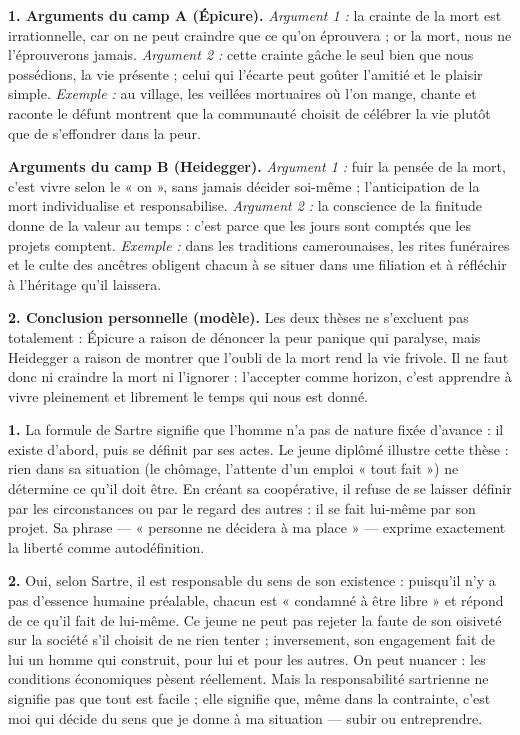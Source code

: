 \documentclass[11pt]{article}
\begin{document}
\begin{corrige}
\textbf{1. Arguments du camp A (Épicure).} \emph{Argument 1 :} la crainte de la mort est irrationnelle, car on ne peut craindre que ce qu'on éprouvera ; or la mort, nous ne l'éprouverons jamais. \emph{Argument 2 :} cette crainte gâche le seul bien que nous possédions, la vie présente ; celui qui l'écarte peut goûter l'amitié et le plaisir simple. \emph{Exemple :} au village, les veillées mortuaires où l'on mange, chante et raconte le défunt montrent que la communauté choisit de célébrer la vie plutôt que de s'effondrer dans la peur.

\textbf{Arguments du camp B (Heidegger).} \emph{Argument 1 :} fuir la pensée de la mort, c'est vivre selon le « on », sans jamais décider soi-même ; l'anticipation de la mort individualise et responsabilise. \emph{Argument 2 :} la conscience de la finitude donne de la valeur au temps : c'est parce que les jours sont comptés que les projets comptent. \emph{Exemple :} dans les traditions camerounaises, les rites funéraires et le culte des ancêtres obligent chacun à se situer dans une filiation et à réfléchir à l'héritage qu'il laissera.

\textbf{2. Conclusion personnelle (modèle).} Les deux thèses ne s'excluent pas totalement : Épicure a raison de dénoncer la peur panique qui paralyse, mais Heidegger a raison de montrer que l'oubli de la mort rend la vie frivole. Il ne faut donc ni craindre la mort ni l'ignorer : l'accepter comme horizon, c'est apprendre à vivre pleinement et librement le temps qui nous est donné.
\end{corrige}

\begin{corrige}
\textbf{1.} La formule de Sartre signifie que l'homme n'a pas de nature fixée d'avance : il existe d'abord, puis se définit par ses actes. Le jeune diplômé illustre cette thèse : rien dans sa situation (le chômage, l'attente d'un emploi « tout fait ») ne détermine ce qu'il doit être. En créant sa coopérative, il refuse de se laisser définir par les circonstances ou par le regard des autres : il se fait lui-même par son projet. Sa phrase — « personne ne décidera à ma place » — exprime exactement la liberté comme autodéfinition.

\textbf{2.} Oui, selon Sartre, il est responsable du sens de son existence : puisqu'il n'y a pas d'essence humaine préalable, chacun est « condamné à être libre » et répond de ce qu'il fait de lui-même. Ce jeune ne peut pas rejeter la faute de son oisiveté sur la société s'il choisit de ne rien tenter ; inversement, son engagement fait de lui un homme qui construit, pour lui et pour les autres. On peut nuancer : les conditions économiques pèsent réellement. Mais la responsabilité sartrienne ne signifie pas que tout est facile ; elle signifie que, même dans la contrainte, c'est moi qui décide du sens que je donne à ma situation — subir ou entreprendre.
\end{corrige}
\end{document}
